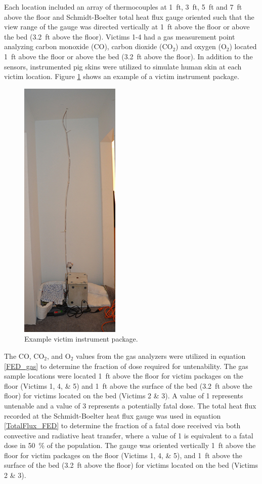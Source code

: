 \documentclass[12pt,oneside]{book}
\begin{document}
Each location included an array of thermocouples at 1~ft, 3~ft, 5~ft and 7~ft above the floor and Schmidt-Boelter total heat flux gauge oriented such that the view range of the gauge was directed vertically at 1~ft above the floor or above the bed (3.2~ft above the floor). Victims 1-4 had a gas measurement point analyzing carbon monoxide (CO), carbon dioxide (CO$_{2}$) and oxygen (O$_{2}$) located 1~ft above the floor or above the bed (3.2~ft above the floor). In addition to the sensors, instrumented pig skins were utilized to simulate human skin at each victim location. Figure \ref{fig:vic_package} shows an example of a victim instrument package. 

\begin{figure}[H]
	\centering
	\includegraphics[height=5in]{../0_Images/Instrumentation/Victim_Package}
	\caption{Example victim instrument package.}
	\label{fig:vic_package}
\end{figure}

The CO, CO$_{2}$, and O$_{2}$ values from the gas analyzers were utilized in equation \ref{FED_gas} to determine the fraction of dose required for untenability. The gas sample locations were located 1~ft above the floor for victim packages on the floor (Victims 1, 4, \& 5) and 1~ft above the surface of the bed (3.2~ft above the floor) for victims located on the bed (Victims 2 \& 3). A value of 1 represents untenable and a value of 3 represents a potentially fatal dose. The total heat flux recorded at the Schmidt-Boelter heat flux gauge was used in equation \ref{TotalFlux_FED} to determine the fraction of a fatal dose received via both convective and radiative heat transfer, where a value of 1 is equivalent to a fatal dose in 50~\% of the population. The gauge was oriented vertically 1~ft above the floor for victim packages on the floor (Victims 1, 4, \& 5), and 1~ft above the surface of the bed (3.2~ft above the floor) for victims located on the bed (Victims 2 \& 3).
\end{document}
